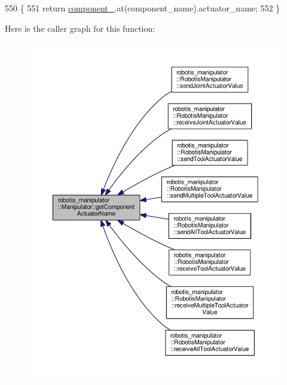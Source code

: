 \begin{DoxyCode}
550 \{
551   \textcolor{keywordflow}{return} \hyperlink{classrobotis__manipulator_1_1_manipulator_a20b388b821f161972c2cf737fe1c26db}{component\_}.at(component\_name).actuator\_name;
552 \}
\end{DoxyCode}


Here is the caller graph for this function\+:\nopagebreak
\begin{figure}[H]
\begin{center}
\leavevmode
\includegraphics[width=350pt]{classrobotis__manipulator_1_1_manipulator_a371446cbf4d2d5a572b173d713305fb1_icgraph}
\end{center}
\end{figure}


